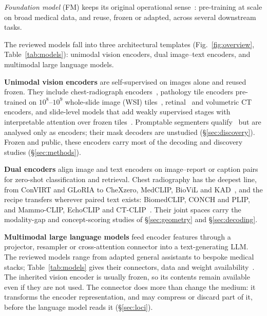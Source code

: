\emph{Foundation model} (FM) keeps its original operational sense~\cite{bommasani2021opportunities,moor2023generalist}:
pre-training at scale on broad medical data, and reuse, frozen or adapted, across several downstream
tasks.

The reviewed models fall into three architectural templates (Fig.~\ref{fig:overview}, Table~\ref{tab:models}):
unimodal vision encoders, dual image--text encoders, and multimodal large language models.

\textbf{Unimodal vision encoders} are self-supervised on images alone and reused frozen. They include chest-radiograph
encoders~\cite{sellergren2022simplified,perezgarcia2024scalable}, pathology tile encoders pre-trained on
$10^{8}$--$10^{9}$ whole-slide image (WSI)
tiles~\cite{chen2024generalpurpose,vorontsov2024model,xu2024wholeslide,zimmermann2024virchow2,filiot2024phikon},
retinal~\cite{zhou2023model} and volumetric CT~\cite{blankemeier2024merlin} encoders, and slide-level models
that add weakly supervised stages with interpretable attention over frozen
tiles~\cite{wang2024pathology,ding2024whole}. Promptable segmenters
qualify~\cite{ma2023anything,zhao2024foundation} but are analysed only as encoders; their mask decoders
are unstudied (\S\ref{sec:discovery}). Frozen and public, these encoders carry most of the decoding and
discovery studies (\S\ref{sec:methods}).

\textbf{Dual encoders} align image and text encoders on image--report or caption pairs for zero-shot
classification and retrieval. Chest radiography has the deepest line, from ConVIRT and GLoRIA to CheXzero,
MedCLIP, BioViL and KAD~\cite{zhang2020visual,huang2021gloria,tiu2022detection,wang2022medclip,boecking2022most,zhang2023visuallanguage},
and the recipe transfers wherever paired text exists: BiomedCLIP, CONCH and PLIP, and Mammo-CLIP,
EchoCLIP and
CT-CLIP~\cite{zhang2023biomedclip,lu2024visuallanguage,huang2023visual,ghosh2024mammoclip,christensen2024vision,hamamci2024ctrate}.
Their joint spaces carry the modality-gap and concept-scoring studies of \S\ref{sec:geometry} and
\S\ref{sec:decoding}.

\textbf{Multimodal large language models} feed encoder features through a projector, resampler or
cross-attention connector into a text-generating LLM. The reviewed models range from adapted general
assistants to bespoke medical stacks; Table~\ref{tab:models} gives their connectors, data and weight
availability~\cite{li2023llavamed,moor2023medflamingo,bannur2024maira2,chen2024model,chaves2024clinically,wu2023model,chen2024huatuogptvision,tu2023biomedical,sellergren2025medgemma,team2025lingshu}.
The inherited vision encoder is usually frozen, so its contents remain available even if they are not
used. The connector does more than change the medium: it transforms the encoder representation, and may
compress or discard part of it, before the language model reads it (\S\ref{sec:loci}).

